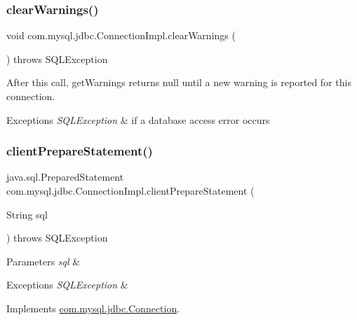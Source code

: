 \subsubsection{\texorpdfstring{clear\+Warnings()}{clearWarnings()}}
{\footnotesize\ttfamily void com.\+mysql.\+jdbc.\+Connection\+Impl.\+clear\+Warnings (\begin{DoxyParamCaption}{ }\end{DoxyParamCaption}) throws S\+Q\+L\+Exception}

After this call, get\+Warnings returns null until a new warning is reported for this connection.


\begin{DoxyExceptions}{Exceptions}
{\em S\+Q\+L\+Exception} & if a database access error occurs \\
\hline
\end{DoxyExceptions}
\mbox{\label{classcom_1_1mysql_1_1jdbc_1_1_connection_impl_a10c73f6da363742abd84a76ea024292d}} 
\subsubsection{\texorpdfstring{client\+Prepare\+Statement()}{clientPrepareStatement()}\hspace{0.1cm}{\footnotesize\ttfamily [1/6]}}
{\footnotesize\ttfamily java.\+sql.\+Prepared\+Statement com.\+mysql.\+jdbc.\+Connection\+Impl.\+client\+Prepare\+Statement (\begin{DoxyParamCaption}\item[{String}]{sql }\end{DoxyParamCaption}) throws S\+Q\+L\+Exception}


\begin{DoxyParams}{Parameters}
{\em sql} & \\
\hline
\end{DoxyParams}

\begin{DoxyExceptions}{Exceptions}
{\em S\+Q\+L\+Exception} & \\
\hline
\end{DoxyExceptions}


Implements \mbox{\hyperlink{interfacecom_1_1mysql_1_1jdbc_1_1_connection_a1836d2e9bc2f4f47fb77b2418d08616a}{com.\+mysql.\+jdbc.\+Connection}}.

